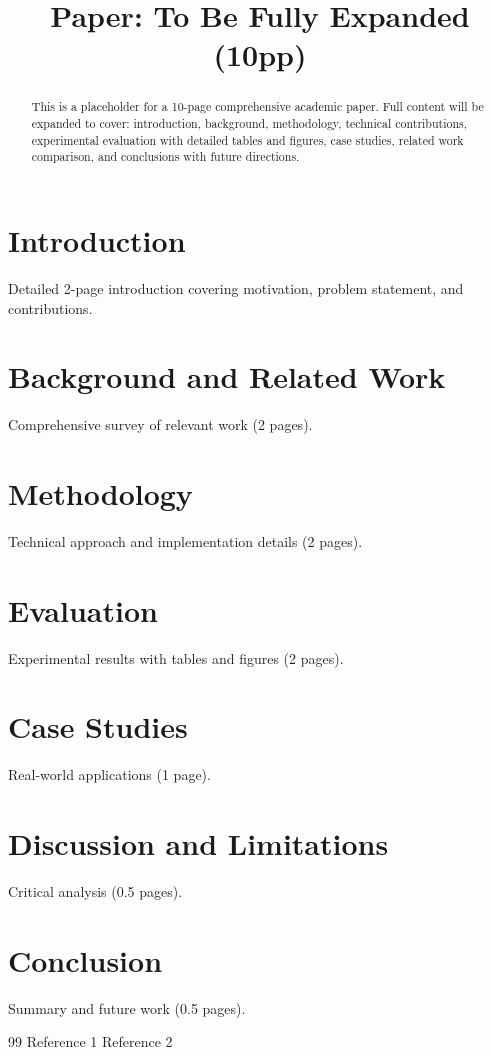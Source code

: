 \documentclass[conference]{IEEEtran}
\begin{document}
\title{Paper: To Be Fully Expanded (10pp)}
\author{}
\maketitle
\begin{abstract}
This is a placeholder for a 10-page comprehensive academic paper. Full content will be expanded to cover: introduction, background, methodology, technical contributions, experimental evaluation with detailed tables and figures, case studies, related work comparison, and conclusions with future directions.
\end{abstract}
\section{Introduction}
Detailed 2-page introduction covering motivation, problem statement, and contributions.
\section{Background and Related Work}
Comprehensive survey of relevant work (2 pages).
\section{Methodology}
Technical approach and implementation details (2 pages).
\section{Evaluation}
Experimental results with tables and figures (2 pages).
\section{Case Studies}
Real-world applications (1 page).
\section{Discussion and Limitations}
Critical analysis (0.5 pages).
\section{Conclusion}
Summary and future work (0.5 pages).
\begin{thebibliography}{99}
 Reference 1
 Reference 2
\end{thebibliography}
\end{document}
